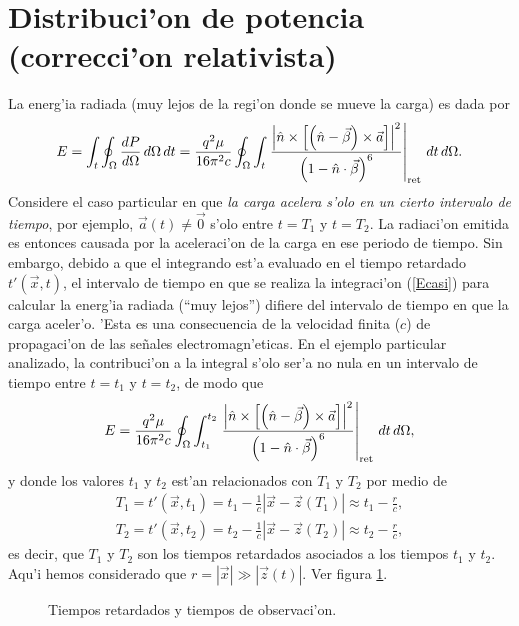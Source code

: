 \section{Distribuci'on de potencia (correcci'on relativista)}
La energ'ia radiada (muy lejos de la regi'on donde se mueve la carga) es dada por 
\begin{equation}
 E=\int_t\oint_\Omega \frac{dP}{d\Omega}\,d\Omega\,dt=\frac{q^2\mu}{16\pi^2 c}\oint_\Omega\int_t\left.\frac{\left|\hat{n}\times
\left[ \left( \hat{n}-\vec{\beta}\right)\times{\vec{a}}\right]\right|^2}{\left(
1-\hat{n}\cdot\vec{\beta}\right) ^{6}}\right|_{\rm ret}\,dt\,d\Omega .
\end{equation}
Considere el caso particular en que \textit{la carga acelera s'olo en un cierto intervalo de tiempo}, por ejemplo, $\vec{a}(t)\neq\vec{0}$ s'olo entre $t=T_1$ y $t=T_2$. La radiaci'on emitida es entonces causada por la aceleraci'on de la carga en ese periodo de tiempo. Sin embargo, debido a que el integrando est'a evaluado en el tiempo retardado $t'(\vec{x},t)$, el intervalo de tiempo en que se realiza la integraci'on (\ref{Ecasi}) para calcular la energ'ia radiada  (``muy lejos'') difiere del intervalo de tiempo en que la carga aceler'o. 'Esta es una consecuencia de la velocidad finita ($c$) de propagaci'on de las se\~nales electromagn'eticas. En el ejemplo particular analizado, la contribuci'on a la integral s'olo ser'a no nula en un intervalo de tiempo entre $t=t_1$ y $t=t_2$, de modo que
\begin{equation}
 E=\frac{q^2\mu}{16\pi^2 c}\oint_\Omega\int_{t_1}^{t_2}\left.\frac{\left|\hat{n}\times
\left[ \left( \hat{n}-\vec{\beta}\right)\times{\vec{a}}\right]\right|^2}{\left(
1-\hat{n}\cdot\vec{\beta}\right) ^{6}}\right|_{\rm ret}\,dt\,d\Omega , \label{Ecasi}
\end{equation}
y donde los valores $t_1$ y $t_2$ est'an relacionados con $T_1$ y $T_2$ por medio de
\begin{eqnarray}
T_1=t'(\vec{x},t_1)=t_1-\frac{1}{c}|\vec{x}-\vec{z}(T_1)|
\approx t_1-\frac{r}{c}, \\
T_2=t'(\vec{x},t_2)=t_2-\frac{1}{c}|\vec{x}-\vec{z}(T_2)|
\approx t_2-\frac{r}{c},
\end{eqnarray}
es decir, que $T_1$ y $T_2$ son los tiempos retardados asociados a los tiempos $t_1$ y $t_2$. Aqu'i hemos considerado que $r=|\vec{x}|\gg |\vec{z}(t)|$. Ver figura \ref{fig:tiempos}.
\begin{figure}[H]
\centerline{}
\caption{Tiempos retardados y tiempos de observaci'on.}
\label{fig:tiempos}
\end{figure}

